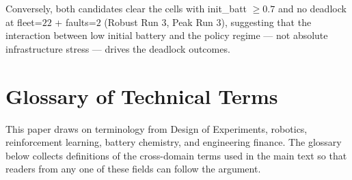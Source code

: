 \documentclass[conference]{IEEEtran}
\begin{document}
Conversely, both candidates clear the cells with init\_batt $\geq 0.7$ and no deadlock at fleet=$22$ + faults=$2$ (Robust Run 3, Peak Run 3), suggesting that the interaction between low initial battery and the policy regime --- not absolute infrastructure stress --- drives the deadlock outcomes.

\section{Glossary of Technical Terms}
\label{app:glossary}

This paper draws on terminology from Design of Experiments, robotics, reinforcement learning, battery chemistry, and engineering finance. The glossary below collects definitions of the cross-domain terms used in the main text so that readers from any one of these fields can follow the argument.
\end{document}
